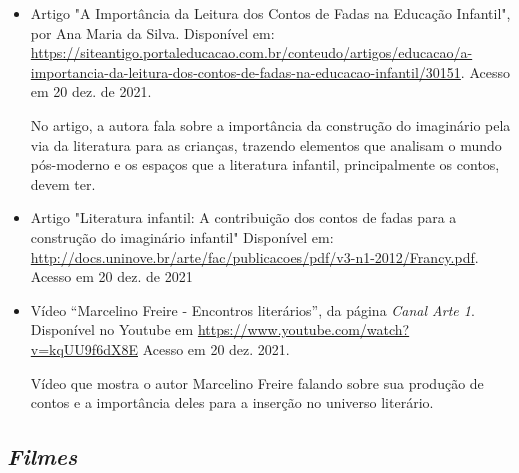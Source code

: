 \documentclass[11pt]{extarticle}
\begin{document}
\begin{itemize}
\item Artigo "A Importância da Leitura dos Contos de Fadas na Educação Infantil", por Ana Maria da Silva. Disponível em: \url{https://siteantigo.portaleducacao.com.br/conteudo/artigos/educacao/a-importancia-da-leitura-dos-contos-de-fadas-na-educacao-infantil/30151}. 
Acesso em 20 dez. de 2021.

No artigo, a autora fala sobre a importância da construção do imaginário pela via da literatura para as crianças, trazendo elementos que analisam o mundo pós-moderno e os espaços que a literatura infantil, principalmente os contos, devem ter.

\item Artigo "Literatura infantil: A contribuição dos contos de fadas para a construção do imaginário infantil" Disponível em: \url{http://docs.uninove.br/arte/fac/publicacoes/pdf/v3-n1-2012/Francy.pdf}. Acesso em 20 dez. de 2021

\item Vídeo “Marcelino Freire - Encontros literários”, da página \textit{Canal Arte 1}. Disponível no Youtube em \url{https://www.youtube.com/watch?v=kqUU9f6dX8E} Acesso em 20 dez. 2021. 

Vídeo que mostra o autor Marcelino Freire falando sobre sua produção de contos e a importância deles para a inserção no universo literário.
\end{itemize}

\subsection{\textit{Filmes}}
\end{document}
